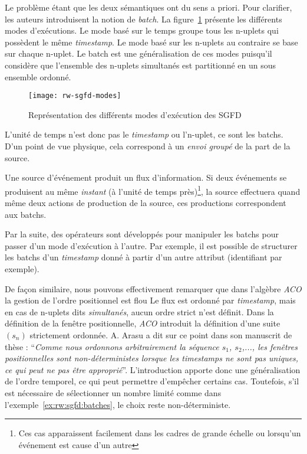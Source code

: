 Le problème étant que les deux sémantiques ont du sens a priori. Pour clarifier, les auteurs introduisent la notion de \textit{batch}. La figure~\ref{fig:rw:sgfd:modes} présente les différents modes d'exécutions. Le mode basé sur le temps groupe tous les n-uplets qui possèdent le même \textit{timestamp}. Le mode basé sur les n-uplets au contraire se base sur chaque n-uplet. Le batch est une généralisation de ces modes puisqu'il considère que l'ensemble des n-uplets simultanés est partitionné en un sous ensemble ordonné.
\begin{figure}[ht]
    \centering
    \texttt{[image: rw-sgfd-modes]}
    \caption{Représentation des différents modes d'exécution des SGFD}\label{fig:rw:sgfd:modes}
\end{figure}
L'unité de temps n'est donc pas le \textit{timestamp} ou l'n-uplet, ce sont les batchs. D'un point de vue physique, cela correspond à un \textit{envoi groupé} de la part de la source.
\begin{example}
 Une source d'événement produit un flux d'information. Si deux événements se produisent au même \textit{instant} (à l'unité de temps près)\footnote{Ces cas apparaissent facilement dans les cadres de grande échelle ou lorsqu'un événement est cause d'un autre}, la source effectuera quand même deux actions de production de la source, ces productions correspondent aux batchs.
\end{example}

Par la suite, des opérateurs sont développés pour manipuler les batchs pour passer d'un mode d'exécution à l'autre. Par exemple, il est possible de structurer les batchs d'un \textit{timestamp} donné à partir d'un autre attribut (identifiant par exemple).

De façon similaire, nous pouvons effectivement remarquer que dans l'algèbre \textit{ACO} la gestion de l'ordre positionnel est flou Le flux est ordonné par \textit{timestamp}, mais en cas de n-uplets dits \textit{simultanés}, aucun ordre strict n'est définit. Dans la définition de la fenêtre positionnelle, \textit{ACO} introduit la définition d'une suite $(s_n)$ strictement ordonnée. A. Arasu a dit sur ce point dans son manuscrit de thèse : \enquote{\it Comme nous ordonnons arbitrairement la séquence $s_1$, $s_2$,..., les fenêtres positionnelles sont non-déterministes lorsque les \textit{timestamps} ne sont pas uniques, ce qui peut ne pas être approprié}. L'introduction apporte donc une généralisation de l'ordre temporel, ce qui peut permettre d'empêcher certains cas. Toutefois, s'il est nécessaire de sélectionner un nombre limité comme dans l'exemple~\ref{ex:rw:sgfd:batches}, le choix reste non-déterministe.

